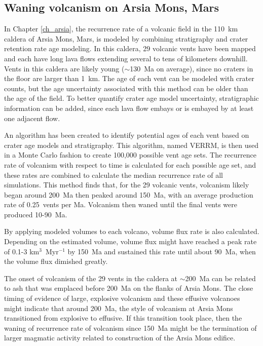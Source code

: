 \subsection{Waning volcanism on Arsia Mons, Mars}
In Chapter \ref{ch_arsia}, the recurrence rate of a volcanic field in the 110~km caldera of Arsia Mons, Mars, is modeled by combining stratigraphy and crater retention rate age modeling. In this caldera, 29 volcanic vents have been mapped and each have long lava flows extending several to tens of kilometers downhill. Vents in this caldera are likely young ($\sim$130~Ma on average), since no craters in the floor are larger than 1~km. The age of each vent can be modeled with crater counts, but the age uncertainty associated with this method can be older than the age of the field. To better quantify crater age model uncertainty, stratigraphic information can be added, since each lava flow embays or is embayed by at least one adjacent flow.

An algorithm has been created to identify potential ages of each vent based on crater age models and stratigraphy. This algorithm, named VERRM, is then used in a Monte Carlo fashion to create 100,000 possible vent age sets. The recurrence rate of volcanism with respect to time is calculated for each possible age set, and these rates are combined to calculate the median recurrence rate of all simulations. This method finds that, for the 29 volcanic vents, volcanism likely began around 200~Ma then peaked around 150~Ma, with an average production rate of 0.25~vents per Ma. Volcanism then waned until the final vents were produced 10-90~Ma.

By applying modeled volumes to each volcano, volume flux rate is also calculated. Depending on the estimated volume, volume flux might have reached a peak rate of 0.1-3 km$^3$~Myr$^{-1}$ by 150~Ma and sustained this rate until about 90~Ma, when the volume flux dimished greatly.

The onset of volcanism of the 29 vents in the caldera at $\sim$200~Ma can be related to ash that was emplaced before 200~Ma on the flanks of Arsia Mons. The close timing of evidence of large, explosive volcanism and these effusive volcanoes might indicate that around 200~Ma, the style of volcanism at Arsia Mons transitioned from explosive to effusive. If this transition took place, then the waning of recurrence rate of volcanism since 150~Ma might be the termination of larger magmatic activity related to construction of the Arsia Mons edifice.


